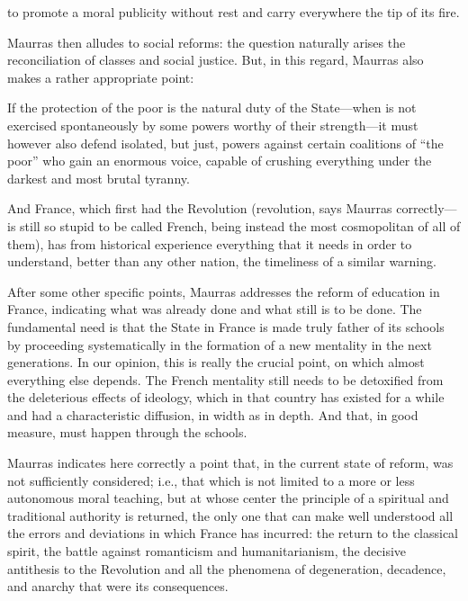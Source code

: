 \begin{quotex}
to promote a moral publicity without rest and carry everywhere the tip of its fire.
\end{quotex}


Maurras then alludes to social reforms: the question naturally arises the reconciliation of classes and social justice. But, in this regard, Maurras also makes a rather appropriate point:

\begin{quotex}
If the protection of the poor is the natural duty of the State---when is not exercised spontaneously by some powers worthy of their strength---it must however also defend isolated, but just, powers against certain coalitions of ``the poor'' who gain an enormous voice, capable of crushing everything under the darkest and most brutal tyranny.
\end{quotex}


And France, which first had the Revolution (revolution, says Maurras correctly---is still so stupid to be called French, being instead the most cosmopolitan of all of them), has from historical experience everything that it needs in order to understand, better than any other nation, the timeliness of a similar warning.

After some other specific points, Maurras addresses the reform of education in France, indicating what was already done and what still is to be done. The fundamental need is that the State in France is made truly father of its schools by proceeding systematically in the formation of a new mentality in the next generations. In our opinion, this is really the crucial point, on which almost everything else depends. The French mentality still needs to be detoxified from the deleterious effects of ideology, which in that country has existed for a while and had a characteristic diffusion, in width as in depth. And that, in good measure, must happen through the schools.

Maurras indicates here correctly a point that, in the current state of reform, was not sufficiently considered; i.e., that which is not limited to a more or less autonomous moral teaching, but at whose center the principle of a spiritual and traditional authority is returned, the only one that can make well understood all the errors and deviations in which France has incurred: the return to the classical spirit, the battle against romanticism and humanitarianism, the decisive antithesis to the Revolution and all the phenomena of degeneration, decadence, and anarchy that were its consequences.

